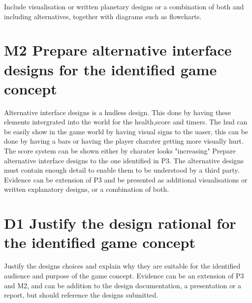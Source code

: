 \documentclass{article}
\begin{document}
Include visualisation or written planetary designs or a combination of both and including alternatives, together with diagrams such as flowcharts.






\section{M2 Prepare alternative interface designs for the identified game concept}
Alternative interface designs is a hudless design. This done by having these elements intergrated into the world for the health,score and timers. The hud can be easily show in the game world by having visual signs to the uaser, this can be done by having a bars or having the player charater getting more visually hurt. The score system can be shown either by charater looks "increasing"
Prepare alternative interface designs to the one identified in P3. The alternative designs must contain enough detail to enable them to be understood by a third party. Evidence can be extension of P3 and be presented as additional visualisations or written explanatory designs, or a combination of both.




\section{D1 Justify the design rational for the identified game concept}


Justify the designs choices and explain why they are suitable for the identified audience and purpose of the game concept. Evidence can be an extension of P3 and M2, and can be addition to the design documentation, a presentation or a report, but should reference the designs submitted.
\end{document}
